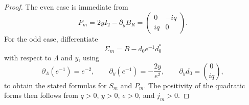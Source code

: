 \documentclass[11pt]{article}
\begin{document}
\begin{proof}
The even case is immediate from
\[
P_m=2yI_2-\partial_yB_R=
\begin{pmatrix}
0 & -iq\\
iq & 0
\end{pmatrix}.
\]
For the odd case, differentiate
\[
\Sigma_m=B-d_0e^{-1}d_0^*
\]
with respect to \(\Lambda\) and \(y\), using
\[
\partial_\Lambda(e^{-1})=e^{-2},
\qquad
\partial_y(e^{-1})=-\frac{2y}{e^2},
\qquad
\partial_y d_0=\binom{0}{iq},
\]
to obtain the stated formulas for \(S_m\) and \(P_m\). The positivity of the
quadratic forms then follows from \(q>0\), \(y>0\), \(e>0\), and \(j_m>0\).
\end{proof}
\end{document}
